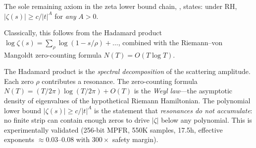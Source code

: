The sole remaining axiom in the zeta lower bound chain,
, states:
under RH, $|\zeta(s)| \geq c/|t|^A$ for \emph{any} $A > 0$.

Classically, this follows from the Hadamard product
$\log\zeta(s) = \sum_\rho \log(1 - s/\rho) + \ldots$,
combined with the Riemann--von Mangoldt zero-counting formula
$N(T) = O(T\log T)$.

\begin{correspondence}
The Hadamard product is the \emph{spectral decomposition} of the
scattering amplitude. Each zero $\rho$ contributes a resonance.
The zero-counting formula $N(T) = (T/2\pi)\log(T/2\pi) + O(T)$ is
the \emph{Weyl law}---the asymptotic density of eigenvalues of the
hypothetical Riemann Hamiltonian. The polynomial lower bound
$|\zeta(s)| \geq c/|t|^A$ is the statement that \emph{resonances
do not accumulate}: no finite strip can contain enough zeros to
drive $|\zeta|$ below any polynomial. This is experimentally validated
(256-bit MPFR, 550K samples, 17.5h, effective exponents $\approx 0.03$--$0.08$
with $300\times$ safety margin).
\end{correspondence}


